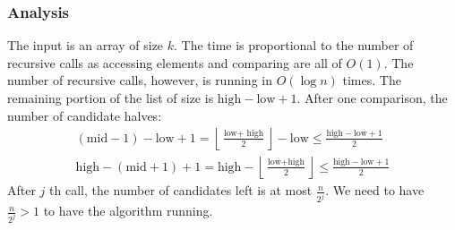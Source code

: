 \documentclass[a4paper]{article}
\theoremstyle{plain}
\theoremstyle{definition}
\theoremstyle{remark}
\begin{document}
\subsubsection{Analysis}
The input is an array of size $k$. The time is proportional to the number of recursive calls as accessing elements and comparing are all of $O(1)$. The number of recursive calls, however, is running in $O(\log n)$ times. The remaining portion of the list of size is $\text{high} - \text{low}+1$. After one comparison, the number of candidate halves: 
\begin{align*}
	(\text{mid} - 1) - \text{low} + 1 = \left\lfloor \frac{\text{low} + \text{ high}}{2} \right\rfloor-\text{low} \le \frac{\text{high}- \text{low}+1}{2} \\
	\text{high} - (\text{mid}+1) +1 = \text{high} - \left\lfloor \frac{\text{low}+\text{high}}{2} \right\rfloor \le  \frac{\text{high}- \text{low} +1 }{2}
\end{align*} 
After $j$ th call, the number of candidates left is at most $\frac{n}{2^{j}}$. We need to have $\frac{n}{2^{j}}>1$ to have the algorithm running. 
\end{document}
